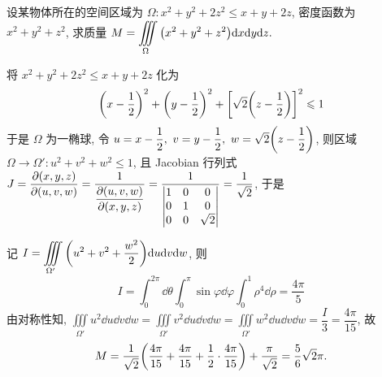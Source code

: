 \begin{example}
    设某物体所在的空间区域为 $\Omega:x^2+y^2+2z^2\leqslant x+y+2z$, 密度函数为 $x^2+y^2+z^2$, 求质量 $\displaystyle M=\iiint\limits_\Omega\qty(x^2+y^2+z^2)\dd x\dd y\dd z.$
\end{example}
\begin{solution}
    将 $x^2+y^2+2z^2\leqslant x+y+2z$ 化为 $$\qty(x-\dfrac{1}{2})^2+\qty(y-\dfrac{1}{2})^2+\qty[\sqrt{2}\qty(z-\dfrac{1}{2})]^2\leqslant 1$$
    于是 $\Omega$ 为一椭球, 令 $u=x-\dfrac{1}{2},~v=y-\dfrac{1}{2},~w=\sqrt{2}\qty(z-\dfrac{1}{2})$, 则区域 $\Omega\to\Omega':u^2+v^2+w^2\leqslant 1$, 
    且 Jacobian 行列式 $\displaystyle J=\pdv{(x,y,z)}{(u,v,w)}=\dfrac{1}{\displaystyle \pdv{(u,v,w)}{(x,y,z)}}=\dfrac{1}{\begin{vmatrix}
                1 & 0 & 0        \\
                0 & 1 & 0        \\
                0 & 0 & \sqrt{2}
            \end{vmatrix}}=\dfrac{1}{\sqrt{2}}$, 于是
    记 $\displaystyle I=\iiint\limits_{\Omega'}\qty(u^2+v^2+\dfrac{w^2}{2})\dd u\dd v\dd w$, 则
    $$I=\int_{0}^{2\pi}\dd \theta\int_{0}^{\pi}\sin\varphi\dd \varphi\int_{0}^{1}\rho^4\dd \rho=\dfrac{4\pi}{5}$$
    由对称性知, $\displaystyle\iiint\limits_{\Omega'}u^2\dd u\dd v\dd w=\iiint\limits_{\Omega'}v^2\dd u\dd v\dd w=\iiint\limits_{\Omega'}w^2\dd u\dd v\dd w=\dfrac{I}{3}=\dfrac{4\pi}{15}$, 
    故 $$M=\dfrac{1}{\sqrt{2}}\qty(\dfrac{4\pi}{15}+\dfrac{4\pi}{15}+\dfrac{1}{2}\cdot\dfrac{4\pi}{15})+\dfrac{\pi}{\sqrt{2}}=\dfrac{5}{6}\sqrt{2}\pi.$$
\end{solution}

